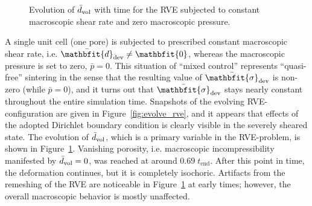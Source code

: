 \documentclass[12pt,a4paper,fleqn]{article}
\renewcommand{\ts}[1]{\mathbfit{#1}}
\newcommand{\figref}[1]{Figure~\ref{#1}}
\begin{document}
%
\begin{figure}[thpb!]
  \centering
  \caption{Evolution of $\bar{d}_{\mathrm{vol}}$ with time for the RVE subjected to constant macroscopic shear rate and zero macroscopic pressure.}
  \label{fig:evolve_graph}
\end{figure}


A single unit cell (one pore) is subjected to prescribed constant macroscopic shear rate, i.e. $\bar{\ts d}_\dev\neq \ts 0$, whereas the macroscopic pressure is set to zero, $\bar{p}=0$. This situation of ``mixed control'' represents ``quasi-free'' sintering in the sense that the resulting value of $\bar{\ts\sigma}_\dev$ is non-zero (while $\bar p = 0 $), and it turns out that $\bar{\ts\sigma}_\dev$ stays nearly constant throughout the entire simulation time.
Snapshots of the evolving RVE-configuration are given in \figref{fig:evolve_rve}, and it appears that effects of the adopted Dirichlet boundary condition is clearly visible in the severely sheared state.
The evolution of $\bar d_{\mathrm{vol}}$, which is a primary variable in the RVE-problem, is shown in \figref{fig:evolve_graph}.
Vanishing porosity, i.e. macroscopic incompressibility manifested by $\bar d_{\mathrm{vol}} = 0$, was reached at around $0.69\;t_{\mathrm{end}}$.
After this point in time, the deformation continues, but it is completely isochoric.
Artifacts from the remeshing of the RVE are noticeable in \figref{fig:evolve_graph} at early times; however, the overall macroscopic behavior is mostly unaffected.
\end{document}
